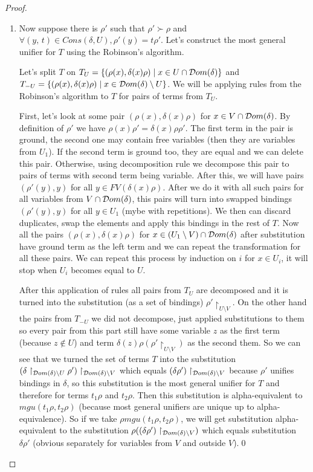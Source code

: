 \begin{proof}
\begin{enumerate}
\item Now suppose there is $\rho'$ such that $\rho' \succ \rho$ and $\forall (y, \, t) \in Cons(\delta, U), \rho'(y) = t \rho'$. Let's construct the most general unifier for $T$ using the Robinson's algorithm.

Let's split $T$ on $T_U = \{ (\rho(x), \delta(x) \rho) \mid x \in U \cap \mathcal{D}om(\delta) \}$ and $T_{-U} = \{ (\rho(x), \delta(x) \rho) \mid x \in  \mathcal{D}om(\delta) \setminus U \}$. We will be applying rules from the Robinson's algorithm to $T$ for pairs of terms from $T_U$.

First, let's look at some pair $(\rho(x), \delta(x) \rho)$ for $x \in V \cap \mathcal{D}om(\delta)$. By definition of $\rho'$ we have $\rho(x) \rho' = \delta(x) \rho \rho'$. The first term in the pair is ground, the second one may contain free variables (then they are variables from $U_1$). If the second term is ground too, they are equal and we can delete this pair. Otherwise, using decomposition rule we decompose this pair to pairs of terms with second term being variable. After this, we will have pairs $(\rho'(y), y)$ for all $y \in FV(\delta(x) \rho)$. After we do it with all such pairs for all variables from $V \cap \mathcal{D}om(\delta)$, this pairs will turn into swapped bindings $(\rho'(y), y)$ for all $y \in U_1$ (mybe with repetitions). We then can discard duplicates, swap the elements and apply this bindings in the rest of $T$. Now all the pairs $(\rho(x), \delta(x) \rho)$ for $x \in (U_1 \setminus V) \cap \mathcal{D}om(\delta)$ after substitution have ground term as the left term and we can repeat the transformation for all these pairs. We can repeat this process by induction on $i$ for $x \in U_i$, it will stop when $U_i$ becomes equal to $U$.

After this application of rules all pairs from $T_U$ are decomposed and it is turned into the substitution (as a set of bindings) $\rho'\restriction_{U \setminus V}$. On the other hand the pairs from $T_{-U}$ we did not decompose, just applied substitutions to them so every pair from this part still have some variable $z$ as the first term (because $z \not\in U$) and term $\delta(z) \rho (\rho'\restriction_{U \setminus V})$ as the second them. So we can see that we turned the set of terms $T$ into the substitution ${(\delta\restriction_{\mathcal{D}om(\delta) \setminus U} \rho')\restriction_{\mathcal{D}om(\delta) \setminus V}}$ which equals ${(\delta \rho')\restriction_{\mathcal{D}om(\delta) \setminus V}}$ because $\rho'$ unifies bindings in $\delta$, so this substitution is the most general unifier for $T$ and therefore for terms $t_1 \rho$ and $t_2 \rho$. Then this substitution is alpha-equivalent to $mgu(t_1 \rho, t_2 \rho)$ (because most general unifiers are unique up to alpha-equivalence). So if we take $\rho mgu(t_1 \rho, t_2 \rho)$, we will get substitution alpha-equivalent to the substitution ${\rho ((\delta \rho')\restriction_{\mathcal{D}om(\delta) \setminus V})}$ which equals substitution $\delta \rho'$ (obvious separately for variables from $V$ and outside $V$).\qed
 

\end{enumerate}
\end{proof}

